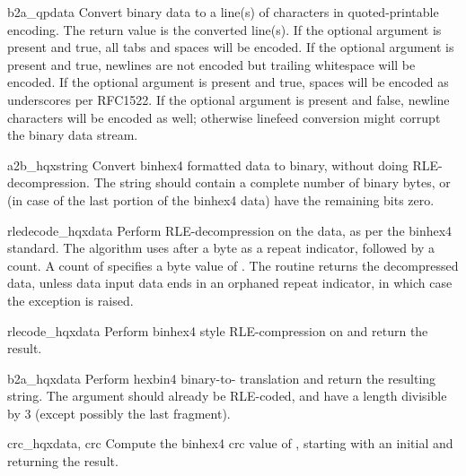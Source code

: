 \begin{funcdesc}{b2a_qp}{data}
Convert binary data to a line(s) of \ASCII{} characters in
quoted-printable encoding.  The return value is the converted line(s).
If the optional argument  is present and true, all tabs
and spaces will be encoded.  
If the optional argument  is present and true,
newlines are not encoded but trailing whitespace will be encoded.
If the optional argument  is
present and true, spaces will be encoded as underscores per RFC1522.
If the optional argument  is present and false, newline
characters will be encoded as well; otherwise linefeed conversion might
corrupt the binary data stream.
\end{funcdesc}

\begin{funcdesc}{a2b_hqx}{string}
Convert binhex4 formatted \ASCII{} data to binary, without doing
RLE-decompression. The string should contain a complete number of
binary bytes, or (in case of the last portion of the binhex4 data)
have the remaining bits zero.
\end{funcdesc}

\begin{funcdesc}{rledecode_hqx}{data}
Perform RLE-decompression on the data, as per the binhex4
standard. The algorithm uses  after a byte as a repeat
indicator, followed by a count. A count of  specifies a byte
value of . The routine returns the decompressed data,
unless data input data ends in an orphaned repeat indicator, in which
case the  exception is raised.
\end{funcdesc}

\begin{funcdesc}{rlecode_hqx}{data}
Perform binhex4 style RLE-compression on  and return the
result.
\end{funcdesc}

\begin{funcdesc}{b2a_hqx}{data}
Perform hexbin4 binary-to-\ASCII{} translation and return the
resulting string. The argument should already be RLE-coded, and have a
length divisible by 3 (except possibly the last fragment).
\end{funcdesc}

\begin{funcdesc}{crc_hqx}{data, crc}
Compute the binhex4 crc value of , starting with an initial
 and returning the result.
\end{funcdesc}

